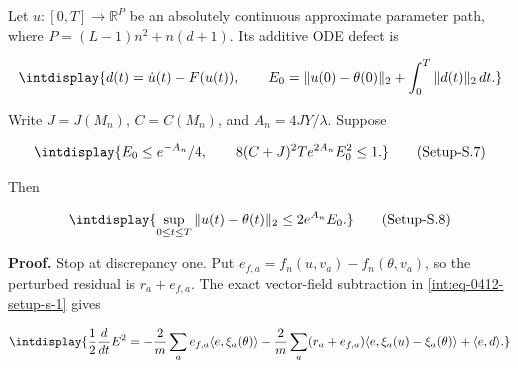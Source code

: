 
Let \(u:[0,\allowbreak T]\to\mathbb R^P\) be an absolutely continuous approximate parameter path, where \(P=(L-1)n^2+n(d+1)\). Its additive ODE defect is


\begingroup\renewcommand{\theHequation}{intdisplay.858}
\begin{equation*}
\intdisplay{
d(t)=\dot u(t)-F(u(t)),\qquad
E_0=\|u(0)-\theta(0)\|_2+\int_0^T\|d(t)\|_2\,dt.
}
\end{equation*}
\endgroup


Write \(J=J(M_n)\), \(C=C(M_n)\), and \(A_n=4JY/\lambda\). Suppose


\label{int:eq-setup-s-7}
\begingroup\renewcommand{\theHequation}{intdisplay.859}
\begin{equation}
\intdisplay{
E_0\le e^{-A_n}/4,\qquad
8(C+J)^2T e^{2A_n}E_0^2\le1.
}
\tag{Setup-S.7}
\label{int:eq-0418-setup-s-7}
\end{equation}
\endgroup


Then


\label{int:eq-setup-s-8}
\begingroup\renewcommand{\theHequation}{intdisplay.860}
\begin{equation}
\intdisplay{
\sup_{0\le t\le T}\|u(t)-\theta(t)\|_2\le 2e^{A_n}E_0.
}
\tag{Setup-S.8}
\label{int:eq-0419-setup-s-8}
\end{equation}
\endgroup


\textbf{Proof.} Stop at discrepancy one. Put \(e_{f,\allowbreak a}=f_n(u,\allowbreak v_a)-f_n(\theta,\allowbreak v_a)\), so the perturbed residual is \(r_a+e_{f,\allowbreak a}\). The exact vector-field subtraction in \hyperref[int:eq-setup-s-1]{\eqref{int:eq-0412-setup-s-1}} gives


\begingroup\renewcommand{\theHequation}{intdisplay.861}
\begin{equation*}
\intdisplay{
\frac12\frac d{dt}E^2
=-\frac2m\sum_a e_{f,a}\langle e,\xi_a(\theta)\rangle
 -\frac2m\sum_a(r_a+e_{f,a})
                  \langle e,\xi_a(u)-\xi_a(\theta)\rangle
 +\langle e,d\rangle.
}
\end{equation*}
\endgroup


